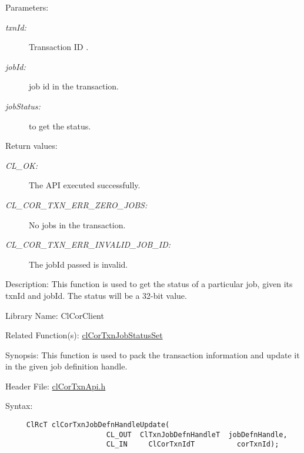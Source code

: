 \begin{Desc}
\item[Parameters:]
\begin{description}
\item[{\em txn\-Id:}]Transaction ID . \item[{\em job\-Id:}]job id in the transaction. \item[{\em job\-Status:}]to get the status.\end{description}
\end{Desc}
\begin{Desc}
\item[Return values:]
\begin{description}
\item[{\em CL\_\-OK:}]The API executed successfully. \item[{\em CL\_\-COR\_\-TXN\_\-ERR\_\-ZERO\_\-JOBS:}]No jobs in the transaction. \item[{\em CL\_\-COR\_\-TXN\_\-ERR\_\-INVALID\_\-JOB\_\-ID:}]The job\-Id passed is invalid.\end{description}
\end{Desc}
\begin{Desc}
\item[Description:]This function is used to get the status of a particular job, given its txn\-Id and job\-Id. The status will be a 32-bit value.\end{Desc}
\begin{Desc}
\item[Library Name:]Cl\-Cor\-Client\end{Desc}
\begin{Desc}
\item[Related Function(s):]\hyperlink{group__group13_ga83}{cl\-Cor\-Txn\-Job\-Status\-Set}\end{Desc}
\begin{Desc}
\item[Synopsis:]This function is used to pack the transaction information and update it in the given job definition handle.\end{Desc}
\begin{Desc}
\item[Header File:]\hyperlink{cl_cor_txn_api_8h}{cl\-Cor\-Txn\-Api.h}\end{Desc}
\begin{Desc}
\item[Syntax:]

\footnotesize\begin{verbatim}     ClRcT clCorTxnJobDefnHandleUpdate(
                        CL_OUT  ClTxnJobDefnHandleT  jobDefnHandle, 
                        CL_IN     ClCorTxnIdT          corTxnId);
\end{verbatim}
\normalsize
 \end{Desc}
